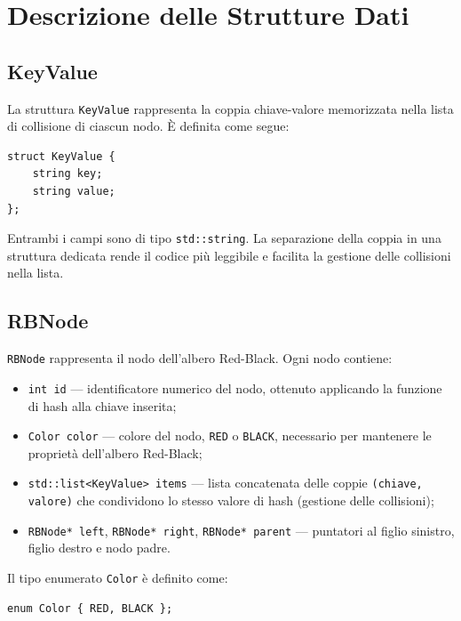 \chapter{Descrizione delle Strutture Dati}

\section{KeyValue}

La struttura \texttt{KeyValue} rappresenta la coppia chiave-valore memorizzata 
nella lista di collisione di ciascun nodo. È definita come segue:

\begin{lstlisting}
struct KeyValue {
    string key;
    string value;
};
\end{lstlisting}

Entrambi i campi sono di tipo \texttt{std::string}. La separazione della coppia 
in una struttura dedicata rende il codice più leggibile e facilita la gestione 
delle collisioni nella lista.

\section{RBNode}

\texttt{RBNode} rappresenta il nodo dell'albero Red-Black. Ogni nodo contiene:

\begin{itemize}
    \item \texttt{int id} --- identificatore numerico del nodo, ottenuto applicando 
    la funzione di hash alla chiave inserita;
    \item \texttt{Color color} --- colore del nodo, \texttt{RED} o \texttt{BLACK}, 
    necessario per mantenere le proprietà dell'albero Red-Black;
    \item \texttt{std::list<KeyValue> items} --- lista concatenata delle coppie 
    \texttt{(chiave, valore)} che condividono lo stesso valore di hash (gestione 
    delle collisioni);
    \item \texttt{RBNode* left}, \texttt{RBNode* right}, \texttt{RBNode* parent} 
    --- puntatori al figlio sinistro, figlio destro e nodo padre.
\end{itemize}

Il tipo enumerato \texttt{Color} è definito come:

\begin{lstlisting}
enum Color { RED, BLACK };
\end{lstlisting}

